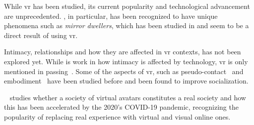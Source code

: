 
While \gls{vr} has been studied, its current popularity and technological advancement are unprecedented.
\vrc, in particular, has been recognized to have unique phenomena such as \emph{mirror dwellers}, which has been studied in \cite{Mao2021} and seem to be a direct result of using \gls{vr}.

Intimacy, relationships and how they are affected in \gls{vr} contexts, has not been explored yet.
While is work in how intimacy is affected by technology, \gls{vr} is only mentioned in passing~\cite[Chapter~8]{Kanwal2019}.
Some of the aspects of \gls{vr}, such as pseudo-contact~\cite{Kulik2020,Freeman2021} and embodiment~\cite{moura2021} have been studied before and been found to improve socialization.

\citeauthor{novak2022rise}~\cite{novak2022rise} studies whether a society of virtual avatars constitutes a real society and how this has been accelerated by the 2020's COVID-19 pandemic, recognizing the popularity of replacing real experience with virtual and visual online ones.


